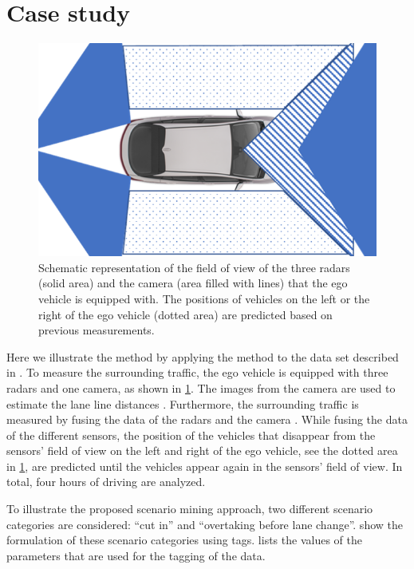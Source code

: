 \section{Case study}
\label{sec:case study}

\begin{figure}
	\centering
	\includegraphics[width=.8\linewidth]{figures/sensors}
	\caption{\cstartd Schematic representation of the field of view of the three radars (solid area) and the camera (area filled with lines) that the ego vehicle is equipped with. The positions of vehicles on the left or the right of the ego vehicle (dotted area) are predicted based on previous measurements.\cendd}
	\label{fig:sensors}
\end{figure}

Here we illustrate the method by applying the method to the data set described in \autocite{paardekooper2019dataset6000km}.
\cstartd To measure the surrounding traffic, the ego vehicle is equipped with three radars and one camera, as shown in \cref{fig:sensors}.
The images from the camera are used to estimate the lane line distances \autocite{elfring2016effective}.
Furthermore, the surrounding traffic is measured by fusing the data of the radars and the camera \autocite{elfring2016effective}.
While fusing the data of the different sensors, the position of the vehicles that disappear from the sensors' field of view on the left and right of the ego vehicle, see the dotted area in \cref{fig:sensors}, are predicted until the vehicles appear again in the sensors' field of view.
In total, four hours of driving are analyzed.
\cendd

\cstartd To illustrate the proposed scenario mining approach, two different scenario categories are considered: ``cut in'' and ``overtaking before lane change''.
 show the formulation of these scenario categories using tags.
 lists the values of the parameters that are used for the tagging of the data.
\cendd

